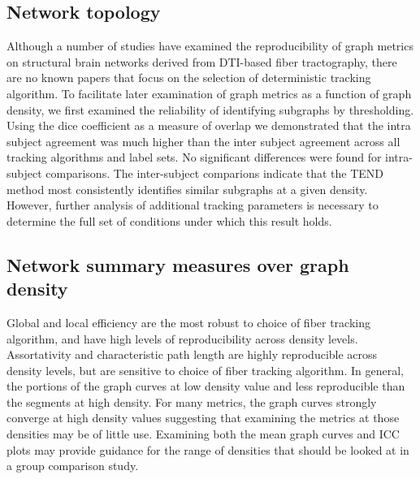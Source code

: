 \documentclass{frontiersSCNS} %
\begin{document}



\subsection{Network topology}
Although a number of studies have examined the reproducibility of graph metrics on 
structural brain networks derived from DTI-based fiber tractography, there are no known 
papers that focus on the selection of deterministic tracking algorithm. To facilitate later examination of
graph metrics as a function of graph density, we first examined the reliability of identifying
subgraphs by thresholding. Using the dice coefficient as a measure of overlap we demonstrated
that the intra subject agreement was much higher than the inter subject agreement across all tracking algorithms and 
label sets. No significant differences were found for intra-subject comparisons. The inter-subject comparions indicate that 
the TEND method most consistently identifies similar subgraphs at a given density. However, further analysis 
of additional tracking parameters is necessary to determine the full set of conditions under which this result holds.


\subsection{Network summary measures over graph density}
Global and local efficiency are the most robust to choice of fiber tracking algorithm, and have high levels 
of reproducibility across density levels. Assortativity and characteristic path length are highly reproducible across
density levels, but are sensitive to choice of fiber tracking algorithm. In general, the portions of the graph curves
at low density value and less reproducible than the segments at high density.  For many metrics, the graph curves 
strongly converge at high density values suggesting that examining the metrics at those densities may be of 
little use. Examining both the mean graph curves and ICC plots may provide guidance for the range of densities
that should be looked at in a group comparison study. 
\end{document}
